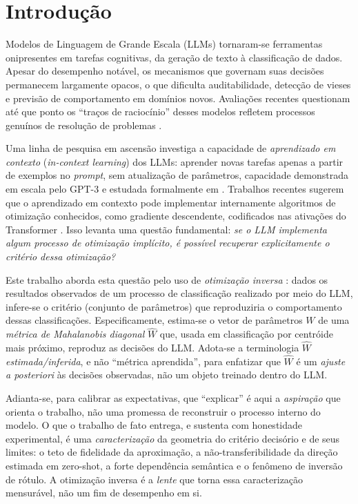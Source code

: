 \documentclass[12pt,a4paper]{article}
\newcommand{\West}{\ensuremath{\hat{W}}}   %
\begin{document}
\tableofcontents
\newpage

\section{Introdução}
\label{sec:intro}

Modelos de Linguagem de Grande Escala (LLMs) tornaram-se ferramentas onipresentes em
tarefas cognitivas, da geração de texto à classificação de dados. Apesar do desempenho
notável, os mecanismos que governam suas decisões permanecem largamente opacos, o que
dificulta auditabilidade, detecção de vieses e previsão de comportamento em domínios
novos. Avaliações recentes questionam até que ponto os ``traços de raciocínio''
desses modelos refletem processos genuínos de resolução de problemas
\cite{shojaeeIllusionThinking2025}.

Uma linha de pesquisa em ascensão investiga a capacidade de \emph{aprendizado em
contexto} (\emph{in-context learning}) dos LLMs: aprender novas tarefas apenas a partir de
exemplos no \emph{prompt}, sem
atualização de parâmetros, capacidade demonstrada em escala pelo GPT-3
\cite{brownLanguageModels2020} e estudada formalmente em
\cite{gargWhatTransformers2022, akyurekWhatLearning2023}.
Trabalhos recentes sugerem que o aprendizado em contexto pode implementar internamente
algoritmos de
otimização conhecidos, como gradiente descendente, codificados nas ativações do
Transformer \cite{akyurekWhatLearning2023}. Isso levanta uma questão fundamental:
\emph{se o LLM implementa algum processo de otimização implícito, é possível recuperar
explicitamente o critério dessa otimização?}

Este trabalho aborda esta questão pelo uso de \emph{otimização inversa}
\cite{chanInverseOptimization2025}: dados os resultados observados de um processo de
classificação realizado por meio do LLM, infere-se o critério (conjunto de parâmetros)
que reproduziria o comportamento dessas classificações. Especificamente, estima-se o
vetor de parâmetros $W$ de uma \emph{métrica de Mahalanobis
diagonal} \West{} que, usada em classificação por centróide mais próximo, reproduz as
decisões do LLM. Adota-se a terminologia \emph{\West{} estimada/inferida}, e não
``métrica aprendida'', para enfatizar que \West{} é um \emph{ajuste \textit{a posteriori}}
às decisões observadas, não um objeto treinado dentro do LLM.

Adianta-se, para calibrar as expectativas, que ``explicar'' é aqui a \emph{aspiração} que
orienta o trabalho, não uma promessa de reconstruir o processo interno do modelo. O que o
trabalho de fato entrega, e sustenta com honestidade experimental, é uma \emph{caracterização}
da geometria do critério decisório e de seus limites: o teto de fidelidade da aproximação, a
não-transferibilidade da direção estimada em zero-shot, a forte dependência semântica e o
fenômeno de inversão de rótulo. A otimização inversa é a \emph{lente} que torna essa
caracterização mensurável, não um fim de desempenho em si.
\end{document}
